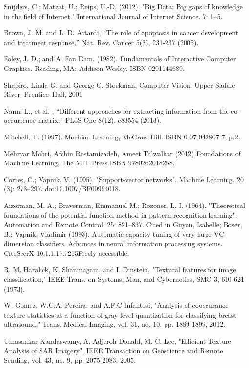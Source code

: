\begin{thebibliography}{99}
\setlength{\parskip}{1em}

Snijders, C.; Matzat, U.; Reips, U.-D. (2012). "Big Data: Big gaps of knowledge in the field of Internet." International Journal of Internet Science. 7: 1–5.

Brown, J. M.  and L. D. Attardi, “The role of apoptosis in cancer development and treatment response,” Nat. Rev. Cancer 5(3), 231-237 (2005).

Foley, J. D.; and A. Fan Dam. (1982). Fundamentals of Interactive Computer Graphics. Reading, MA: Addison-Wesley. ISBN 0201144689.

Shapiro, Linda G.  and George C. Stockman, Computer Vision. Upper Saddle River: Prentice–Hall, 2001

Nanni L., et al. , “Different approaches for extracting information from the co-occurrence matrix,” PLoS One 8(12), e83554 (2013).

Mitchell, T. (1997). Machine Learning, McGraw Hill. ISBN 0-07-042807-7, p.2.

Mehryar Mohri, Afshin Rostamizadeh, Ameet Talwalkar (2012) Foundations of Machine Learning, The MIT Press ISBN 9780262018258.

Cortes, C.; Vapnik, V. (1995). "Support-vector networks". Machine Learning. 20 (3): 273–297. doi:10.1007/BF00994018.

Aizerman, M. A.; Braverman, Emmanuel M.; Rozoner, L. I. (1964). "Theoretical foundations of the potential function method in pattern recognition learning". Automation and Remote Control. 25: 821–837. Cited in Guyon, Isabelle; Boser, B.; Vapnik, Vladimir (1993). Automatic capacity tuning of very large VC-dimension classifiers. Advances in neural information processing systems. CiteSeerX 10.1.1.17.7215Freely accessible.

R. M. Haralick, K. Shanmugam, and I. Dinstein, "Textural features for image classification," IEEE Trans. on Systems, Man, and Cybernetics, SMC-3, 610-621 (1973).

W. Gomez, W.C.A. Pereira, and A.F.C Infantosi, "Analysis of cooccurance texture statistics as a function of gray-level quantization for classifying breast ultrasound," Trans. Medical Imaging, vol. 31, no. 10, pp. 1889-1899, 2012.

Umasankar Kandaswamy, A. Adjeroh Donald, M. C. Lee, "Efficient Texture Analysis of SAR Imagery", IEEE Transaction on Geoscience and Remote Sending, vol. 43, no. 9, pp. 2075-2083, 2005.


\end{thebibliography}
